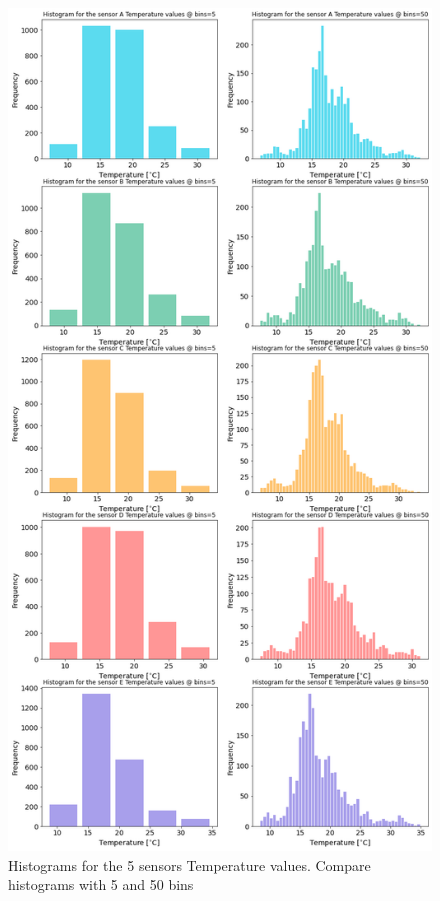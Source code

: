 \documentclass[a4paper]{article}
\numberwithin{figure}{section}
\numberwithin{table}{section}
\begin{document}
\begin{figure}
\centering
\includegraphics[scale=0.38]{Figures/figA12.png}
\caption{Histograms for the 5 sensors Temperature values. Compare histograms with 5 and 50 bins}

\label{Fig:A12}
\end{figure}
\end{document}
